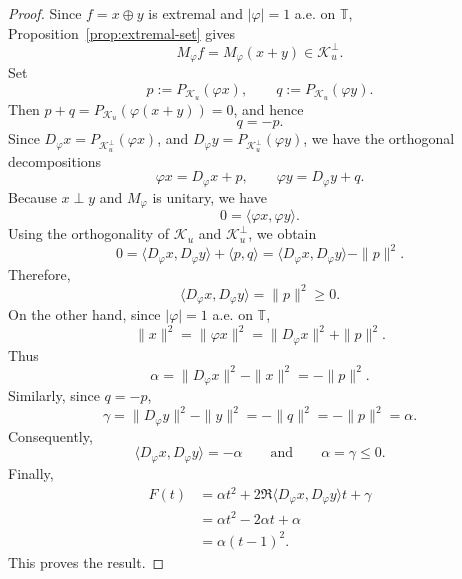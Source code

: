 \documentclass[12pt]{amsart}
\theoremstyle{definition}
\theoremstyle{remark}
\def \T{\mathbb{T}}
\newcommand{\clk}{\mathcal{K}}
\newcommand{\vp}{\varphi}
\numberwithin{equation}{section}
\begin{document}
\begin{proof}
Since $f=x\oplus y$ is extremal and $|\vp|=1$ a.e. on $\T$, Proposition~\ref{prop:extremal-set} gives
\[
M_\vp f=M_\vp(x+y)\in\clk_u^\perp.
\]
Set
\[
p:=P_{\clk_u}(\vp x),\qquad q:=P_{\clk_u}(\vp y).
\]
Then $p+q=P_{\clk_u}\left(\vp(x+y)\right) =0$, and hence
\[
q=-p.
\]
Since $D_\vp x=P_{\clk_u^\perp}(\vp x)$, and $D_\vp y=P_{\clk_u^\perp}(\vp y)$, we have the orthogonal decompositions
\[
\vp x=D_\vp x+p,\qquad \vp y=D_\vp y+q.
\]
Because $x\perp y$ and $M_\vp$ is unitary, we have
\[
0=\langle \vp x,\vp y\rangle.
\]
Using the orthogonality of $\clk_u$ and $\clk_u^\perp$, we obtain
\[
0=\langle D_\vp x,D_\vp y\rangle+\langle p,q\rangle =\langle D_\vp x,D_\vp y\rangle-\|p\|^2.
\]
Therefore,
\[
\langle D_\vp x,D_\vp y\rangle=\|p\|^2\geq0.
\]
On the other hand, since $|\vp|=1$ a.e. on $\T$,
\[
\|x\|^2=\|\vp x\|^2=\|D_\vp x\|^2+\|p\|^2.
\]
Thus
\[
\alpha=\|D_\vp x\|^2-\|x\|^2=-\|p\|^2.
\]
Similarly, since $q=-p$,
\[
\gamma=\|D_\vp y\|^2-\|y\|^2=-\|q\|^2=-\|p\|^2=\alpha.
\]
Consequently,
\[
\langle D_\vp x,D_\vp y\rangle=-\alpha\qquad\text{and}\qquad \alpha=\gamma\leq0.
\]
Finally,
\[
\begin{aligned}
F(t)&=\alpha t^2+2\Re\langle D_\vp x,D_\vp y\rangle t+\gamma\\
	&=\alpha t^2-2\alpha t+\alpha\\
	&=\alpha(t-1)^2.
\end{aligned}
\]
This proves the result.
\end{proof}
\end{document}
